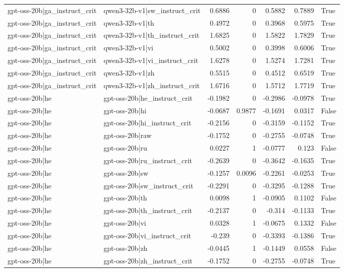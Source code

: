 \begin{table}
\begin{tabular}{l l r r r r l}
gpt-oss-20b|ga_instruct_crit & qwen3-32b-v1|sw_instruct_crit & 0.6886 & 0 & 0.5882 & 0.7889 & True \\
gpt-oss-20b|ga_instruct_crit & qwen3-32b-v1|th & 0.4972 & 0 & 0.3968 & 0.5975 & True \\
gpt-oss-20b|ga_instruct_crit & qwen3-32b-v1|th_instruct_crit & 1.6825 & 0 & 1.5822 & 1.7829 & True \\
gpt-oss-20b|ga_instruct_crit & qwen3-32b-v1|vi & 0.5002 & 0 & 0.3998 & 0.6006 & True \\
gpt-oss-20b|ga_instruct_crit & qwen3-32b-v1|vi_instruct_crit & 1.6278 & 0 & 1.5274 & 1.7281 & True \\
gpt-oss-20b|ga_instruct_crit & qwen3-32b-v1|zh & 0.5515 & 0 & 0.4512 & 0.6519 & True \\
gpt-oss-20b|ga_instruct_crit & qwen3-32b-v1|zh_instruct_crit & 1.6716 & 0 & 1.5712 & 1.7719 & True \\
gpt-oss-20b|he & gpt-oss-20b|he_instruct_crit & -0.1982 & 0 & -0.2986 & -0.0978 & True \\
gpt-oss-20b|he & gpt-oss-20b|hi & -0.0687 & 0.9877 & -0.1691 & 0.0317 & False \\
gpt-oss-20b|he & gpt-oss-20b|hi_instruct_crit & -0.2156 & 0 & -0.3159 & -0.1152 & True \\
gpt-oss-20b|he & gpt-oss-20b|raw & -0.1752 & 0 & -0.2755 & -0.0748 & True \\
gpt-oss-20b|he & gpt-oss-20b|ru & 0.0227 & 1 & -0.0777 & 0.123 & False \\
gpt-oss-20b|he & gpt-oss-20b|ru_instruct_crit & -0.2639 & 0 & -0.3642 & -0.1635 & True \\
gpt-oss-20b|he & gpt-oss-20b|sw & -0.1257 & 0.0096 & -0.2261 & -0.0253 & True \\
gpt-oss-20b|he & gpt-oss-20b|sw_instruct_crit & -0.2291 & 0 & -0.3295 & -0.1288 & True \\
gpt-oss-20b|he & gpt-oss-20b|th & 0.0098 & 1 & -0.0905 & 0.1102 & False \\
gpt-oss-20b|he & gpt-oss-20b|th_instruct_crit & -0.2137 & 0 & -0.314 & -0.1133 & True \\
gpt-oss-20b|he & gpt-oss-20b|vi & 0.0328 & 1 & -0.0675 & 0.1332 & False \\
gpt-oss-20b|he & gpt-oss-20b|vi_instruct_crit & -0.239 & 0 & -0.3393 & -0.1386 & True \\
gpt-oss-20b|he & gpt-oss-20b|zh & -0.0445 & 1 & -0.1449 & 0.0558 & False \\
gpt-oss-20b|he & gpt-oss-20b|zh_instruct_crit & -0.1752 & 0 & -0.2755 & -0.0748 & True \\

\end{tabular}
\end{table}
